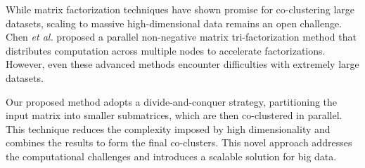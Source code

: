 While matrix factorization techniques have shown promise for co-clustering large datasets, scaling to massive high-dimensional data remains an open challenge. Chen \textit{et al.}\cite{chen2023ParallelNonNegativeMatrix} proposed a parallel non-negative matrix tri-factorization method that distributes computation across multiple nodes to accelerate factorizations. However, even these advanced methods encounter difficulties with extremely large datasets.

Our proposed method adopts a divide-and-conquer strategy, partitioning the input matrix into smaller submatrices, which are then co-clustered in parallel. This technique reduces the complexity imposed by high dimensionality and combines the results to form the final co-clusters. This novel approach addresses the computational challenges and introduces a scalable solution for big data.